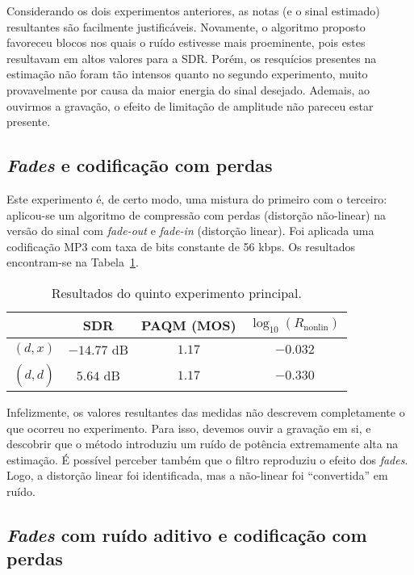 Considerando os dois experimentos anteriores, as notas (e o sinal estimado) resultantes são facilmente justificáveis. Novamente, o algoritmo proposto favoreceu blocos nos quais o ruído estivesse mais proeminente, pois estes resultavam em altos valores para a SDR. Porém, os resquícios presentes na estimação não foram tão intensos quanto no segundo experimento, muito provavelmente por causa da maior energia do sinal desejado. Ademais, ao ouvirmos a gravação, o efeito de limitação de amplitude não pareceu estar presente.

\subsection{\textit{Fades} e codificação com perdas}

Este experimento é, de certo modo, uma mistura do primeiro com o terceiro: aplicou-se um algoritmo de compressão com perdas (distorção não-linear) na versão do sinal com \textit{fade-out} e \textit{fade-in} (distorção linear). Foi aplicada uma codificação MP3 com taxa de bits constante de 56 kbps. Os resultados encontram-se na Tabela~\ref{tab:correntropy:experiment-5}.
{\def\arraystretch{1.25}\tabcolsep=10pt
\begin{table}[!ht]
    \centering
    \caption[Resultados do quinto experimento: \textit{fades} e codificação com perdas]{Resultados do quinto experimento principal.}
    \label{tab:correntropy:experiment-5}
    \begin{tabular}{cccc}
        \toprule
                         & SDR        & PAQM (MOS)   & $\log_{10}(R_{\text{nonlin}})$ \\
        \midrule
        $(d, x)$       & $-14.77$ dB & $1.17$  &  $-0.032$               \\
        $(d, \hat{d})$ & $5.64$ dB & $1.17$  &  $-0.330$             \\ \bottomrule
    \end{tabular}
\end{table}
}

Infelizmente, os valores resultantes das medidas não descrevem completamente o que ocorreu no experimento. Para isso, devemos ouvir a gravação em si, e descobrir que o método introduziu um ruído de potência extremamente alta na estimação. É possível perceber também que o filtro reproduziu o efeito dos \textit{fades}. Logo, a distorção linear foi identificada, mas a não-linear foi ``convertida'' em ruído.

\subsection{\textit{Fades} com ruído aditivo e codificação com perdas}

